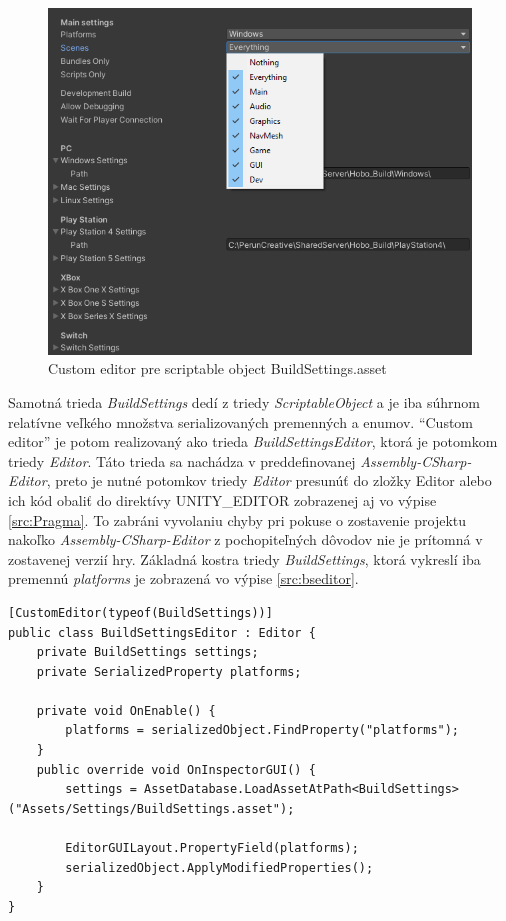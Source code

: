 \documentclass[slovak, bachelorpractice]{diploma}
\begin{document}
\begin{figure}[!htbp]
	\centering
	\includegraphics[width=.90\textwidth]{Pictures/buildDetail.png}
	\caption{Custom editor pre scriptable object BuildSettings.asset}
	\label{pic:Custom}
\end{figure}

Samotná trieda \textit{BuildSettings} dedí z triedy \textit{ScriptableObject} a je iba súhrnom relatívne veľkého množstva serializovaných premenných a enumov. \enquote{Custom editor} je potom realizovaný ako trieda \textit{BuildSettingsEditor}, ktorá je potomkom triedy \textit{Editor}. Táto trieda sa nachádza v preddefinovanej \textit{Assembly-CSharp-Editor}, preto je nutné potomkov triedy \textit{Editor} presunúť do zložky Editor alebo ich kód obaliť do direktívy UNITY\_EDITOR zobrazenej aj vo výpise \ref{src:Pragma}. To zabráni vyvolaniu chyby pri pokuse o zostavenie projektu nakoľko \textit{Assembly-CSharp-Editor} z pochopiteľných dôvodov nie je prítomná v zostavenej verzií hry. Základná kostra triedy \textit{BuildSettings}, ktorá vykreslí iba premennú \textit{platforms} je zobrazená vo výpise \ref{src:bseditor}.

\vspace{10pt}
\begin{lstlisting}[label=src:bseditor,caption={Kostra triedy určenej pre vykreslenie vlastného okna v Editore Unity}]
[CustomEditor(typeof(BuildSettings))]
public class BuildSettingsEditor : Editor {
    private BuildSettings settings;
    private SerializedProperty platforms;
    
    private void OnEnable() {
        platforms = serializedObject.FindProperty("platforms");
    }
    public override void OnInspectorGUI() {
        settings = AssetDatabase.LoadAssetAtPath<BuildSettings>("Assets/Settings/BuildSettings.asset");
        
        EditorGUILayout.PropertyField(platforms);
        serializedObject.ApplyModifiedProperties();
    }
}
\end{lstlisting}
\end{document}
